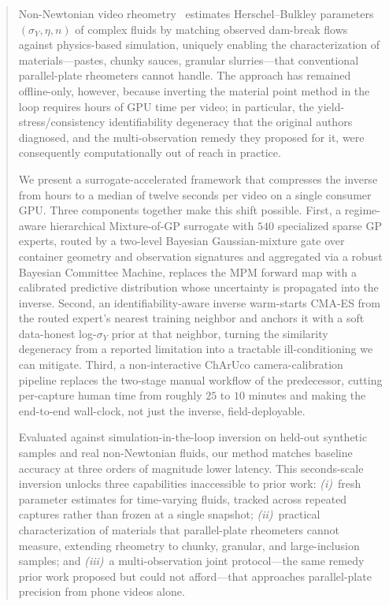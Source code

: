 \documentclass[acmtog,anonymous,review]{acmart}
\begin{document}
\begin{abstract}
Non-Newtonian video rheometry~\cite{hamamichi2023nonnewtonian}
estimates Herschel--Bulkley parameters $(\sigma_Y, \eta, n)$ of complex
fluids by matching observed dam-break flows against physics-based
simulation, uniquely enabling the characterization of
materials---pastes, chunky sauces, granular slurries---that
conventional parallel-plate rheometers cannot handle. The approach has
remained offline-only, however, because inverting the material point
method in the loop requires hours of GPU time per video; in particular,
the yield-stress/consistency identifiability degeneracy that the
original authors diagnosed, and the multi-observation remedy they
proposed for it, were consequently computationally out of reach in
practice.

We present a surrogate-accelerated framework that compresses the
inverse from hours to a median of twelve seconds per video on a single
consumer GPU. Three components together make this shift possible.
First, a regime-aware hierarchical Mixture-of-GP surrogate with $540$
specialized sparse GP experts, routed by a two-level Bayesian
Gaussian-mixture gate over container geometry and observation
signatures and aggregated via a robust Bayesian Committee Machine,
replaces the MPM forward map with a calibrated predictive
distribution whose uncertainty is propagated into the inverse.
Second, an identifiability-aware inverse warm-starts CMA-ES from the
routed expert's nearest training neighbor and anchors it with a soft
data-honest log-$\sigma_Y$ prior at that neighbor, turning the
similarity degeneracy from a reported limitation into a tractable
ill-conditioning we can mitigate. Third, a non-interactive ChArUco
camera-calibration pipeline replaces the two-stage manual workflow of
the predecessor, cutting per-capture human time from roughly $25$ to
$10$ minutes and making the end-to-end wall-clock, not just the
inverse, field-deployable.

Evaluated against simulation-in-the-loop inversion on held-out
synthetic samples and real non-Newtonian fluids, our method matches
baseline accuracy at three orders of magnitude lower latency. This
seconds-scale inversion unlocks three capabilities inaccessible to
prior work: \emph{(i)}~fresh parameter estimates for time-varying
fluids, tracked across repeated captures rather than frozen at a
single snapshot; \emph{(ii)}~practical characterization of materials
that parallel-plate rheometers cannot measure, extending rheometry to
chunky, granular, and large-inclusion samples; and \emph{(iii)}~a
multi-observation joint protocol---the same remedy prior work
proposed but could not afford---that approaches parallel-plate
precision from phone videos alone.
\end{abstract}
\end{document}
